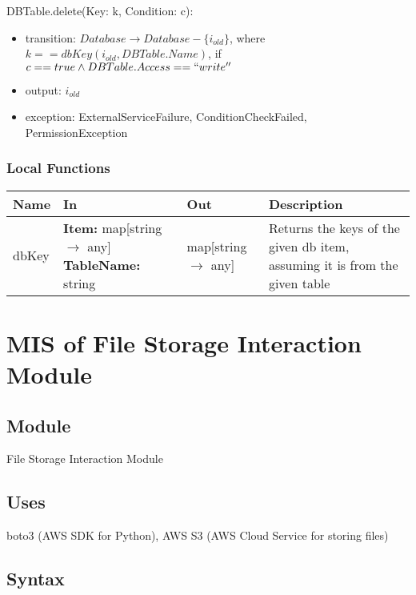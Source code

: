 \documentclass[12pt, titlepage]{article}
\begin{document}
\noindent DBTable.delete(Key: k, Condition: c):
\begin{itemize}
  \item transition: $Database \rightarrow Database - \{i_{old}\}$, where
    $k==dbKey(i_{old}, DBTable.Name)$, if $c == true \land
    DBTable.Access == ``write''$
  \item output: $i_{old}$
  \item exception: ExternalServiceFailure, ConditionCheckFailed,
    PermissionException
\end{itemize}

\subsubsection{Local Functions}

\begin{center}
  \begin{tabular}{>{\raggedright}p{2cm} >{\raggedright}p{5cm}
    >{\raggedright}p{3.5cm} p{4.5cm}}
    \hline
    \textbf{Name} & \textbf{In} & \textbf{Out} & \textbf{Description} \\
    \hline
    dbKey & \textbf{Item:} map[string $\rightarrow$ any] \newline
    \textbf{TableName:} string & map[string $\rightarrow$ any] &
    Returns the keys of the given db item, assuming it is from the
    given table \\
    \hline
  \end{tabular}
\end{center}

\section{MIS of File Storage Interaction Module} \label{Module}

\subsection{Module}

File Storage Interaction Module

\subsection{Uses}

boto3 (AWS SDK for Python), AWS S3 (AWS Cloud Service for storing files)

\subsection{Syntax}
\end{document}

